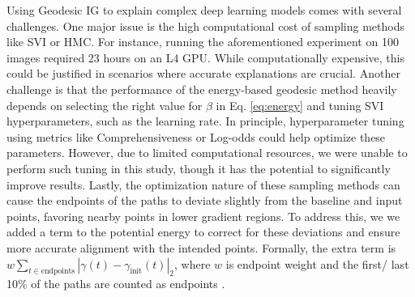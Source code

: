 Using Geodesic IG to explain complex deep learning models comes with several challenges. One major issue is the high computational cost of sampling methods like SVI or HMC. For instance, running the aforementioned experiment on 100 images required 23 hours on an L4 GPU. While computationally expensive, this could be justified in scenarios where accurate explanations are crucial. Another challenge is that the performance of the energy-based geodesic method heavily depends on selecting the right value for $\beta$ in Eq. \ref{eq:energy} and tuning SVI hyperparameters, such as the learning rate. In principle, hyperparameter tuning using metrics like Comprehensiveness or Log-odds could help optimize these parameters. However, due to limited computational resources, we were unable to perform such tuning in this study, though it has the potential to significantly improve results. Lastly, the optimization nature of these sampling methods can cause the endpoints of the paths to deviate slightly from the baseline and input points, favoring nearby points in lower gradient regions. To address this, we we added a term to the potential energy to correct for these deviations and ensure more accurate alignment with the intended points.  Formally, the extra term is $w \sum_{t \in \text{endpoints}} |\gamma(t) - \gamma_{\text{init}}(t)|_2$, where $w$ is endpoint weight and the first/ last 10\% of the paths are counted as endpoints .